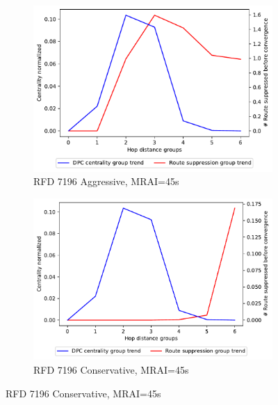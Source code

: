 \begin{figure}[H]
\begin{subfigure}[b]{0.325\textwidth}
     \end{subfigure}
     \hfill
     \begin{subfigure}[b]{0.325\textwidth}
         \centering
         \includegraphics[width=\textwidth]{images/RFD/miceVSelephants/MultiMRAI/45/mice/cisco_1000_RFD_7196_aggressive_nodeConvergence_centVSsup_trend.pdf}
         \caption{\scriptsize RFD 7196 Aggressive, MRAI=45s}
         \label{fig:1000_7196RFDA_centVSsup_mices_MRAI45}
     \end{subfigure}
     \hfill
     \begin{subfigure}[b]{0.325\textwidth}
         \centering
         \includegraphics[width=\textwidth]{images/RFD/miceVSelephants/MultiMRAI/45/mice/cisco_1000_RFD_7196_conservative_nodeConvergence_centVSsup_trend.pdf}
         \caption{\scriptsize RFD 7196 Conservative, MRAI=45s}
         \label{fig:1000_7196RFDC_centVSsup_mices_MRAI45}

\end{subfigure}
\end{figure}
